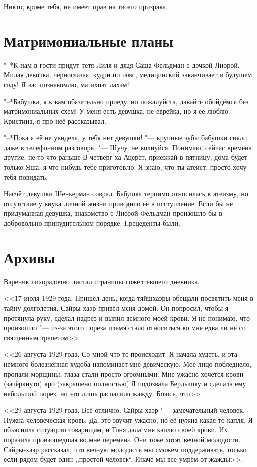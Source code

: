 Никто, кроме тебя, не имеет прав на твоего призрака.

\section{Матримониальные планы}

"--*К нам в гости придут тетя Лиля и дядя Саша Фельдман с дочкой Лиорой.
Милая девочка, черноглазая, кудри по пояс, медицинский заканчивает в будущем году!
Я вас познакомлю, ма ихпат лахэм?

"--*Бабушка, я к вам обязательно приеду, но пожалуйста, давайте обойдёмся без матримониальных схем!
У меня есть девушка, не еврейка, но я её люблю.
Кристина, я про неё рассказывал.

"--*Пока я её не увидела, у тебя нет девушки! "--- крупные зубы бабушки сияли даже в телефонном разговоре.
"--- Шучу, не волнуйся.
Понимаю, сейчас времена другие, не то что раньше\ldotst
В четверг ха-Ацерет, приезжай в пятницу, дома будет только Яша, я что-нибудь тебе приготовлю.
Я знаю, что ты атеист, просто хочу тебя повидать.

Насчёт девушки Шенкерман соврал.
Бабушка терпимо относилась к атеизму, но отсутствие у внука личной жизни приводило её в исступление.
Если бы не придуманная девушка, знакомство с Лиорой Фельдман произошло бы в добровольно-принудительном порядке.
Прецеденты были.

\section{Архивы}

Вареник лихорадочно листал страницы пожелтевшего дневника.

<<17 июля 1929 года.
Пришёл день, когда тяйшхаэры обещали посвятить меня в тайну долголетия.
Сайры-хаэр привёл меня домой.
Он попросил, чтобы я протянула руку, сделал надрез и выпил немного моей крови.
Я не понимаю, что произошло "--- из-за этого пореза племя стало относиться ко мне едва ли не со священным трепетом\ldotst>>

<<26 августа 1929 года.
Со мной что-то происходит.
Я начала худеть, и эта немного болезненная худоба напоминает мне девическую.
Моё лицо побледнело, пропали морщины, глаза стали просто огромными.
Мне ужасно хочется крови (зачёркнуто) кро (закрашено полностью)
Я подозвала Бердышку и сделала ему небольшой порез, но это лишь распалило жажду.
Боюсь, что\ldotst>>

<<29 августа 1929 года.
Всё отлично.
Сайры-хаэр "--- замечательный человек. 
Нужна человеческая кровь.
Да, это звучит ужасно, но её нужна какая-то капля.
Я объяснила ситуацию товарищам, и Тоня дала мне каплю своей крови.
Их поразила произошедшая во мне перемена.
Они тоже хотят вечной молодости.
Сайры-хаэр рассказал, что вечную молодость мы сможем поддерживать, только если рядом будет один ,,простой человек``.
Иначе мы все умрём от жажды>>.


